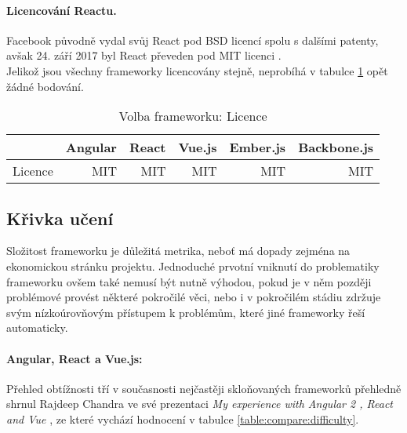 \paragraph{Licencování Reactu.} Facebook původně vydal svůj React pod BSD licencí \cite{bsd-license} spolu s dalšími patenty, avšak 24. září 2017 byl React převeden pod MIT licenci \cite{react-license-commit, react-license}.
\\
Jelikož jsou všechny frameworky licencovány stejně, neprobíhá v tabulce \ref{table:compare:license} opět žádné bodování.

\begin{table}[h]
\caption{Volba frameworku: Licence}
\label{table:compare:license}
\begin{tabular}{lrrrrr}
\hline
                                         & Angular                     & React                     & Vue.js                     & Ember.js                     & Backbone.js               \\ \hline
Licence                                  & MIT                         & MIT                       & MIT                        & MIT                          & MIT                       \\
\end{tabular}
\end{table}


\subsection{Křivka učení}

Složitost frameworku je důležitá metrika, neboť má dopady zejména na ekonomickou stránku projektu. Jednoduché prvotní vniknutí do problematiky frameworku ovšem také nemusí být nutně výhodou, pokud je v něm později problémové provést některé pokročilé věci, nebo i v pokročilém stádiu zdržuje svým nízkoúrovňovým přístupem k problémům, které jiné frameworky řeší automaticky.

\paragraph{Angular, React a Vue.js:} Přehled obtížnosti tří v současnosti nejčastěji skloňovaných frameworků přehledně shrnul Rajdeep Chandra ve své prezentaci \emph{My experience with Angular 2 , React and Vue} \cite{frameworks-3compare}, ze které vychází hodnocení v tabulce \ref{table:compare:difficulty}.


